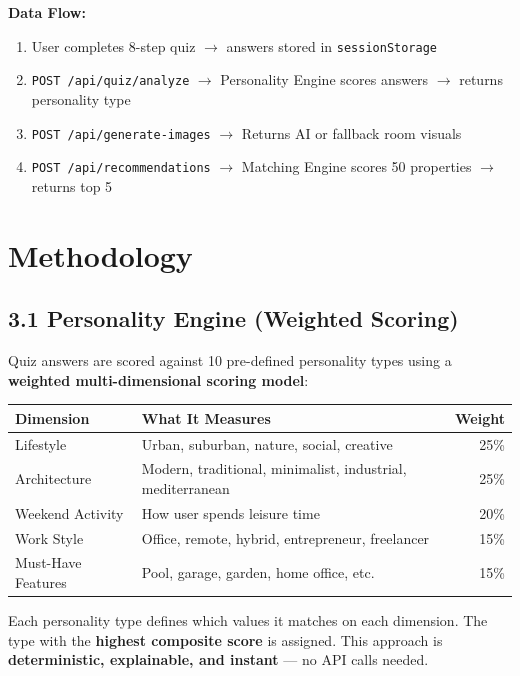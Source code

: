 \documentclass[11pt,a4paper]{article}
\begin{document}
\noindent\textbf{Data Flow:}
\begin{enumerate}[nosep]
    \item User completes 8-step quiz $\rightarrow$ answers stored in \texttt{sessionStorage}
    \item \texttt{POST /api/quiz/analyze} $\rightarrow$ Personality Engine scores answers $\rightarrow$ returns personality type
    \item \texttt{POST /api/generate-images} $\rightarrow$ Returns AI or fallback room visuals
    \item \texttt{POST /api/recommendations} $\rightarrow$ Matching Engine scores 50 properties $\rightarrow$ returns top 5
\end{enumerate}

\section{Methodology}

\subsection{3.1 Personality Engine (Weighted Scoring)}

Quiz answers are scored against 10 pre-defined personality types using a \textbf{weighted multi-dimensional scoring model}:

\begin{table}[h]
\centering
\begin{tabular}{@{}llr@{}}
\toprule
\textbf{Dimension} & \textbf{What It Measures} & \textbf{Weight} \\
\midrule
Lifestyle & Urban, suburban, nature, social, creative & 25\% \\
Architecture & Modern, traditional, minimalist, industrial, mediterranean & 25\% \\
Weekend Activity & How user spends leisure time & 20\% \\
Work Style & Office, remote, hybrid, entrepreneur, freelancer & 15\% \\
Must-Have Features & Pool, garage, garden, home office, etc. & 15\% \\
\bottomrule
\end{tabular}
\end{table}

\noindent Each personality type defines which values it matches on each dimension. The type with the \textbf{highest composite score} is assigned. This approach is \textbf{deterministic, explainable, and instant} --- no API calls needed.
\end{document}
